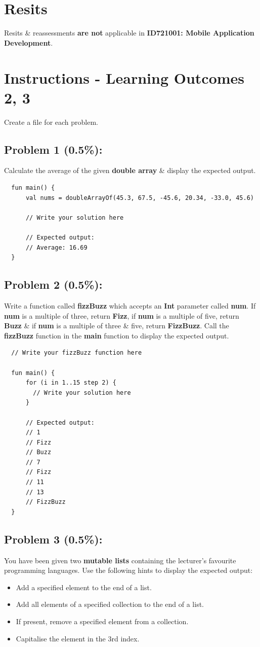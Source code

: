 \documentclass{article}
\begin{document}
\section*{Resits}
Resits \& reassessments \textbf{are not} applicable in \textbf{ID721001: Mobile Application Development}.

\section*{Instructions - Learning Outcomes 2, 3}
Create a file for each problem.

\subsection*{Problem 1 (0.5\%):}
Calculate the average of the given \textbf{double array} \& display the expected output.

\begin{verbatim}
  fun main() {
      val nums = doubleArrayOf(45.3, 67.5, -45.6, 20.34, -33.0, 45.6)

      // Write your solution here

      // Expected output:
      // Average: 16.69 
  }
\end{verbatim}

\subsection*{Problem 2 (0.5\%):}
Write a function called \textbf{fizzBuzz} which accepts an \textbf{Int} parameter called \textbf{num}. If \textbf{num} is a multiple of three, return \textbf{Fizz}, if \textbf{num} is a multiple of five, return \textbf{Buzz} \& if \textbf{num} is a multiple of three \& five, return \textbf{FizzBuzz}. Call the \textbf{fizzBuzz} function in the \textbf{main} function to display the expected output.

\begin{verbatim}
  // Write your fizzBuzz function here
  
  fun main() {
      for (i in 1..15 step 2) {
        // Write your solution here
      }

      // Expected output:
      // 1
      // Fizz
      // Buzz
      // 7
      // Fizz
      // 11
      // 13
      // FizzBuzz
  }
\end{verbatim}

\subsection*{Problem 3 (0.5\%):} You have been given two \textbf{mutable lists} containing the lecturer's favourite programming languages. Use the following hints to display the expected output:
\begin{itemize}
  \item Add a specified element to the end of a list.
  \item Add all elements of a specified collection to the end of a list.
  \item If present, remove a specified element from a collection.
  \item Capitalise the element in the 3rd index.
\end{itemize}
\end{document}
